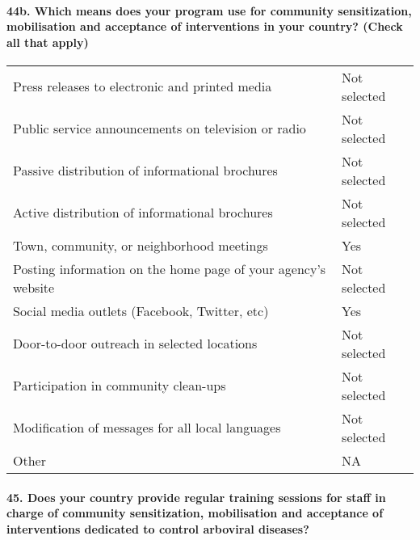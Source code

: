 \documentclass[
]{article}
\begin{document}
\hypertarget{b.-which-means-does-your-program-use-for-community-sensitization-mobilisation-and-acceptance-of-interventions-in-your-country-check-all-that-apply}{%
\paragraph{44b. Which means does your program use for community
sensitization, mobilisation and acceptance of interventions in your
country? (Check all that
apply)}\label{b.-which-means-does-your-program-use-for-community-sensitization-mobilisation-and-acceptance-of-interventions-in-your-country-check-all-that-apply}}

\begin{longtable}[]{@{}
  >{\raggedright\arraybackslash}p{}
  >{\raggedright\arraybackslash}p{}@{}}
\toprule
\endhead
Press releases to electronic and printed media & Not selected \\
Public service announcements on television or radio & Not selected \\
Passive distribution of informational brochures & Not selected \\
Active distribution of informational brochures & Not selected \\
Town, community, or neighborhood meetings & Yes \\
Posting information on the home page of your agency's website & Not
selected \\
Social media outlets (Facebook, Twitter, etc) & Yes \\
Door-to-door outreach in selected locations & Not selected \\
Participation in community clean-ups & Not selected \\
Modification of messages for all local languages & Not selected \\
Other & NA \\
\bottomrule
\end{longtable}

\hypertarget{does-your-country-provide-regular-training-sessions-for-staff-in-charge-of-community-sensitization-mobilisation-and-acceptance-of-interventions-dedicated-to-control-arboviral-diseases}{%
\paragraph{45. Does your country provide regular training sessions for
staff in charge of community sensitization, mobilisation and acceptance
of interventions dedicated to control arboviral
diseases?}\label{does-your-country-provide-regular-training-sessions-for-staff-in-charge-of-community-sensitization-mobilisation-and-acceptance-of-interventions-dedicated-to-control-arboviral-diseases}}
\end{document}
